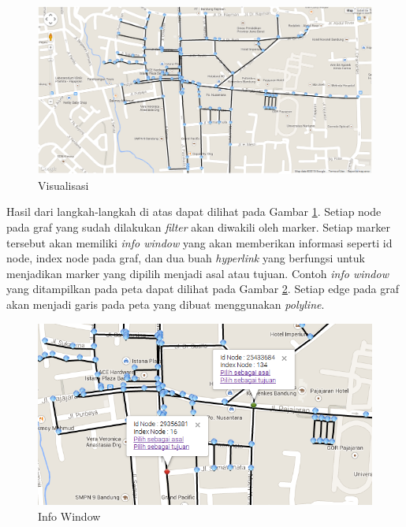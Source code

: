 \begin{figure}[h]
\centering
\includegraphics[scale=0.5]{Gambar/visualisasi_graf}
\caption[Visualisasi]{Visualisasi}
\label{fig:visualisasi}
\end{figure}
Hasil dari langkah-langkah di atas dapat dilihat pada Gambar
\ref{fig:visualisasi}. Setiap node pada graf yang sudah dilakukan
\textit{filter} akan diwakili oleh marker. Setiap marker tersebut akan memiliki \textit{info
window} yang akan memberikan informasi seperti id node, index node pada graf,
dan dua buah \textit{hyperlink} yang berfungsi untuk menjadikan marker yang
dipilih menjadi asal atau tujuan. Contoh \textit{info window} yang ditampilkan
pada peta dapat dilihat pada Gambar \ref{fig:visualisasi_infowindow}. Setiap
edge pada graf akan menjadi garis pada peta yang dibuat menggunakan \textit{polyline}.
\begin{figure}[h]
\centering
\includegraphics[scale=0.8]{Gambar/visualisasi_infowindow}
\caption[Info Window]{Info Window}
\label{fig:visualisasi_infowindow}
\end{figure}

